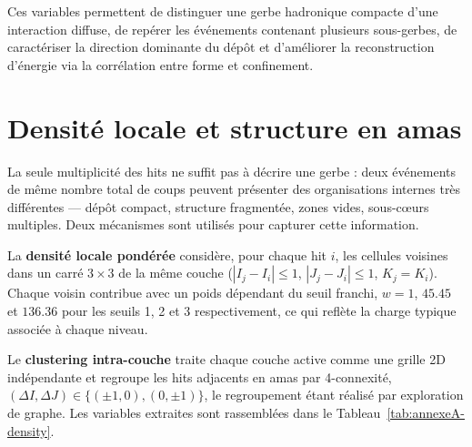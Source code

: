 Ces variables permettent de distinguer une gerbe hadronique compacte d'une interaction diffuse, de repérer les événements contenant plusieurs sous-gerbes, de caractériser la direction dominante du dépôt et d'améliorer la reconstruction d'énergie via la corrélation entre forme et confinement.

\section{Densité locale et structure en amas}
\label{annexe:densityclusters}

La seule multiplicité des hits ne suffit pas à décrire une gerbe : deux événements de même nombre total de coups peuvent présenter des organisations internes très différentes — dépôt compact, structure fragmentée, zones vides, sous-cœurs multiples. Deux mécanismes sont utilisés pour capturer cette information.

La \textbf{densité locale pondérée} considère, pour chaque hit \(i\), les cellules voisines dans un carré \(3\times3\) de la même couche (\(|I_j-I_i|\le 1\), \(|J_j-J_i|\le 1\), \(K_j=K_i\)). Chaque voisin contribue avec un poids dépendant du seuil franchi, \(w=1\), \(45.45\) et \(136.36\) pour les seuils 1, 2 et 3 respectivement, ce qui reflète la charge typique associée à chaque niveau.

Le \textbf{clustering intra-couche} traite chaque couche active comme une grille 2D indépendante et regroupe les hits adjacents en amas par 4-connexité, \((\Delta I,\Delta J)\in \{(\pm1,0),(0,\pm1)\}\), le regroupement étant réalisé par exploration de graphe. Les variables extraites sont rassemblées dans le Tableau~\ref{tab:annexeA-density}.

